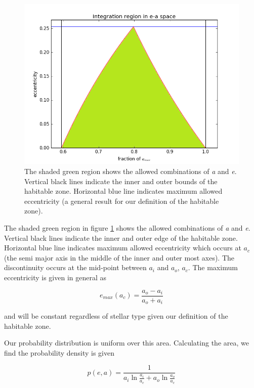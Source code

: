 \documentclass{article}
\begin{document}
	\begin{figure}
		\includegraphics[width = \linewidth]{bounds_e_a.png}
		\caption{The shaded green region shows the allowed combinations of \textit{a} and \textit{e}. Vertical black lines indicate the inner and outer bounds of the habitable zone. Horizontal blue line indicates maximum allowed eccentricity (a general result for our definition of the habitable zone). }
		\label{e vs a}
	\end{figure}
	
	The shaded green region in figure \ref{e vs a} shows the allowed combinations of \textit{a} and \textit{e}. Vertical black lines indicate the inner and outer edge of the habitable zone. Horizontal blue line indicates maximum allowed eccentricity which occurs at $a_c$ (the semi major axis in the middle of the inner and outer most axes). The discontinuity occurs at the mid-point between $a_{i}$ and $a_{o}$, $a_{c}$. The maximum eccentricity is given in general as
	
	\begin{equation}
	e_{max}(a_c) = \frac{a_o - a_i}{a_o + a_i}
	\end{equation}
	
and will be constant regardless of stellar type given our definition of the habitable zone.
	
	Our probability distribution is uniform over this area. Calculating the area, we find the probability density is given 
	
	\begin{equation}
	p(e,a) = \frac{1}{a_{i}\ln{\frac{a_{i}}{a_{c}}} + a_{o}\ln{\frac{a_{o}}{a_{c}}}}
	\end{equation}
	
\end{document}

